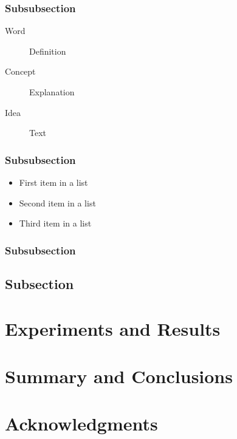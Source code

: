 \documentclass[fleqn,10pt]{SelfArx} %
\begin{document}
\subsubsection{Subsubsection}

\lipsum[12] %

\begin{description}
\item[Word] Definition
\item[Concept] Explanation
\item[Idea] Text
\end{description}

\subsubsection{Subsubsection}

\lipsum[13] %

\begin{itemize}[noitemsep] %
\item First item in a list
\item Second item in a list
\item Third item in a list
\end{itemize}

\subsubsection{Subsubsection}

\lipsum[14] %

\subsection{Subsection}

\lipsum[15-23] %

\section{Experiments and Results}

\section{Summary and Conclusions}
\section*{Acknowledgments} %
\end{document}
